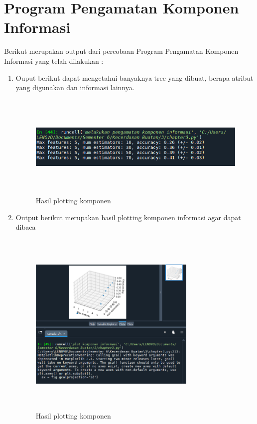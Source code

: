 \section{Program Pengamatan Komponen Informasi}
Berikut merupakan output dari percobaan Program Pengamatan Komponen Informasi yang telah dilakukan :
\begin{enumerate}
    \item Ouput berikut dapat mengetahui banyaknya tree yang dibuat, berapa atribut yang digunakan dan informasi lainnya.
          \begin{figure}
              \centering
              \includegraphics[width=11cm,height=5cm]{figures/Cp3-20.png}
              \caption{Hasil plotting komponen}
              \label{penanda}
          \end{figure}
    \item Output berikut merupakan hasil plotting komponen informasi agar dapat dibaca
          \begin{figure}
              \centering
              \includegraphics[width=8cm,height=9cm]{figures/Cp3-21.png}
              \caption{Hasil plotting komponen}
              \label{penanda}
          \end{figure}
\end{enumerate}